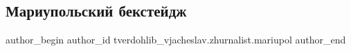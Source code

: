  
 
 
 
 

\subsection{Мариупольский бекстейдж}
\label{sec:02_02_2023.fb.tverdohlib_vjacheslav.zhurnalist.mariupol.2.mariupolskii_bekstei}

\ifcmt
 author_begin
   author_id tverdohlib_vjacheslav.zhurnalist.mariupol
 author_end
\fi
